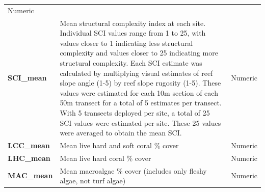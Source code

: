 \documentclass[12pt,]{article}
\begin{document}
\begin{longtable}[]{@{}lll@{}}
\begin{minipage}[t]{0.15\columnwidth}
Numeric\strut
\end{minipage}\tabularnewline
\begin{minipage}[t]{0.44\columnwidth}\raggedright
\textbf{SCI\_mean}\strut
\end{minipage} & \begin{minipage}[t]{0.32\columnwidth}\raggedright
Mean structural complexity index at each site. Individual SCI values
range from 1 to 25, with values closer to 1 indicating less structural
complexity and values closer to 25 indicating more structural
complexity. Each SCI estimate was calculated by multiplying visual
estimates of reef slope angle (1-5) by reef slope rugosity (1-5). These
values were estimated for each 10m section of each 50m transect for a
total of 5 estimates per transect. With 5 transects deployed per site, a
total of 25 SCI values were estimated per site. These 25 values were
averaged to obtain the mean SCI.\strut
\end{minipage} & \begin{minipage}[t]{0.15\columnwidth}\raggedright
Numeric\strut
\end{minipage}\tabularnewline
\begin{minipage}[t]{0.44\columnwidth}\raggedright
\textbf{LCC\_mean}\strut
\end{minipage} & \begin{minipage}[t]{0.32\columnwidth}\raggedright
Mean live hard and soft coral \% cover\strut
\end{minipage} & \begin{minipage}[t]{0.15\columnwidth}\raggedright
Numeric\strut
\end{minipage}\tabularnewline
\begin{minipage}[t]{0.44\columnwidth}\raggedright
\textbf{LHC\_mean}\strut
\end{minipage} & \begin{minipage}[t]{0.32\columnwidth}\raggedright
Mean live hard coral \% cover\strut
\end{minipage} & \begin{minipage}[t]{0.15\columnwidth}\raggedright
Numeric\strut
\end{minipage}\tabularnewline
\begin{minipage}[t]{0.44\columnwidth}\raggedright
\textbf{MAC\_mean}\strut
\end{minipage} & \begin{minipage}[t]{0.32\columnwidth}\raggedright
Mean macroalgae \% cover (includes only fleshy algae, not turf
algae)\strut
\end{minipage} & \begin{minipage}[t]{0.15\columnwidth}\raggedright
Numeric\strut
\end{minipage}\tabularnewline
\bottomrule
\end{longtable}
\end{document}
